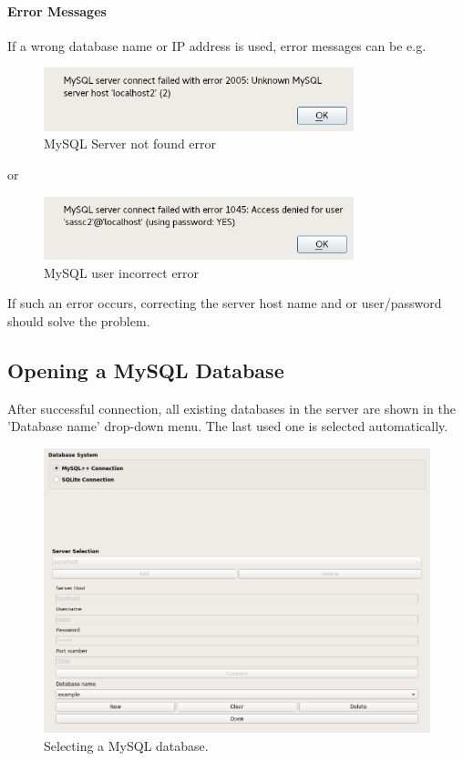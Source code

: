 \paragraph{Error Messages}

If a wrong database name or IP address is used, error messages can be e.g. \\

\begin{figure}[H]
  \center
    \includegraphics[width=9cm,frame]{figures/mysql_connect_error.png}
  \caption{MySQL Server not found error}
\end{figure}

 or 

\begin{figure}[H]
  \center
    \includegraphics[width=9cm,frame]{figures/mysql_user_error.png}
  \caption{MySQL user incorrect error}
\end{figure}

If such an error occurs, correcting the server host name and or user/password should solve the problem. 


\subsection{Opening a MySQL Database}
\label{sec:mysql_open_db}

After successful connection, all existing databases in the server are shown in the 'Database name' drop-down menu. The last used one is selected automatically.

\begin{figure}[H]
  \center
    \includegraphics[width=16cm,frame]{figures/mysql_database_selection.png}
  \caption{Selecting a MySQL database.}
  \label{fig:mysql_db_select}
\end{figure}

